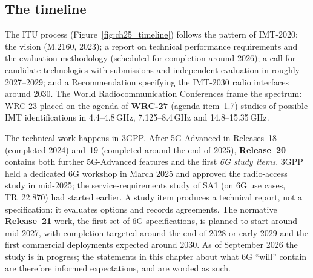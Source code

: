 \subsection{The timeline}

The ITU process (Figure~\ref{fig:ch25_timeline}) follows the pattern of IMT-2020: the vision
(M.2160, 2023); a report on technical performance requirements and the evaluation methodology
(scheduled for completion around 2026); a call for candidate technologies with submissions and
independent evaluation in roughly 2027--2029; and a Recommendation specifying the IMT-2030 radio
interfaces around 2030. The World Radiocommunication Conferences frame the spectrum: WRC-23 placed
on the agenda of \textbf{WRC-27} (agenda item~1.7) studies of possible IMT identifications in
4.4--4.8\,GHz, 7.125--8.4\,GHz and 14.8--15.35\,GHz.

The technical work happens in 3GPP. After 5G-Advanced in Releases~18 (completed 2024) and~19
(completed around the end of 2025), \textbf{Release~20} contains both further 5G-Advanced
features and the first \emph{6G study items}. 3GPP held a dedicated 6G workshop in March 2025 and
approved the radio-access study in mid-2025; the service-requirements study of SA1 (on 6G use cases,
TR~22.870) had started earlier. A study item produces a technical report, not a specification: it
evaluates options and records agreements. The normative \textbf{Release~21} work, the first set of
6G specifications, is planned to start around mid-2027, with completion targeted around the end of
2028 or early 2029 and the first commercial deployments expected around 2030. As of September 2026
the study is in progress; the statements in this chapter about what 6G ``will'' contain are therefore
informed expectations, and are worded as such.


